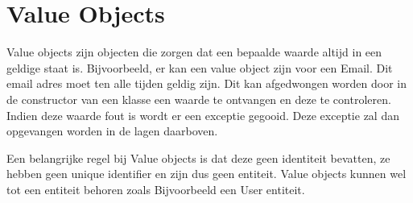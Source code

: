 
\section{Value Objects}
\label{sec:value-objects}

Value objects zijn objecten die zorgen dat een bepaalde waarde altijd in een geldige staat is. Bijvoorbeeld, er kan een value object zijn voor een Email. Dit email adres moet ten alle tijden geldig zijn. Dit kan afgedwongen worden door in de constructor van een klasse een waarde te ontvangen en deze te controleren. Indien deze waarde fout is wordt er een exceptie gegooid. Deze exceptie zal dan opgevangen worden in de lagen daarboven.

Een belangrijke regel bij Value objects is dat deze geen identiteit bevatten, ze hebben geen unique identifier en zijn dus geen entiteit. Value objects kunnen wel tot een entiteit behoren zoals Bijvoorbeeld een User entiteit.
